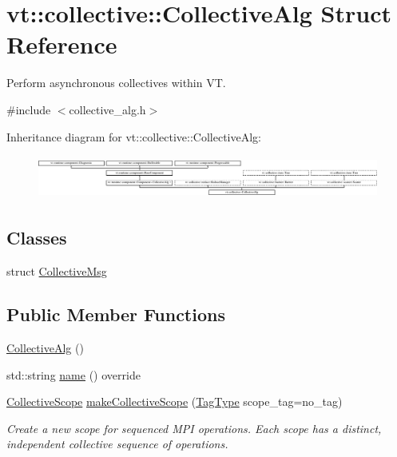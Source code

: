 \hypertarget{structvt_1_1collective_1_1_collective_alg}{}\section{vt\+:\+:collective\+:\+:Collective\+Alg Struct Reference}
\label{structvt_1_1collective_1_1_collective_alg}


Perform asynchronous collectives within VT.  




{\ttfamily \#include $<$collective\+\_\+alg.\+h$>$}

Inheritance diagram for vt\+:\+:collective\+:\+:Collective\+Alg\+:\begin{figure}[H]
\begin{center}
\leavevmode
\includegraphics[height=1.435897cm]{structvt_1_1collective_1_1_collective_alg}
\end{center}
\end{figure}
\subsection*{Classes}
\begin{DoxyCompactItemize}
\item 
struct \hyperlink{structvt_1_1collective_1_1_collective_alg_1_1_collective_msg}{Collective\+Msg}
\end{DoxyCompactItemize}
\subsection*{Public Member Functions}
\begin{DoxyCompactItemize}
\item 
\hyperlink{structvt_1_1collective_1_1_collective_alg_aa137479fb6afcfa33e73592ea3cbbcd8}{Collective\+Alg} ()
\item 
std\+::string \hyperlink{structvt_1_1collective_1_1_collective_alg_a81788afa34bc094c9f71fef8681aefb3}{name} () override
\item 
\hyperlink{structvt_1_1collective_1_1_collective_scope}{Collective\+Scope} \hyperlink{structvt_1_1collective_1_1_collective_alg_a6f2b4c832a5cc11cb7dfc238ecd48edf}{make\+Collective\+Scope} (\hyperlink{namespacevt_a84ab281dae04a52a4b243d6bf62d0e52}{Tag\+Type} scope\+\_\+tag=no\+\_\+tag)
\begin{DoxyCompactList}\small\item\em Create a new scope for sequenced M\+PI operations. Each scope has a distinct, independent collective sequence of operations. \end{DoxyCompactList}\end{DoxyCompactItemize}
